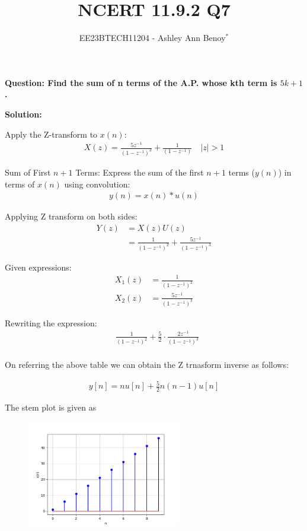 \documentclass[journal,12pt,twocolumn]{IEEEtran}
\theoremstyle{remark}
\begin{document}

\vspace{3cm}

\title{NCERT 11.9.2  Q7}
\author{EE23BTECH11204 - Ashley Ann Benoy$^{*}$}%
\maketitle
\newpage
\bigskip

\renewcommand{\thefigure}{\theenumi}
\renewcommand{\thetable}{\theenumi}



\textbf{Question: Find the sum of n terms of the A.P. whose kth term is \(5k + 1\).}

\textbf{Solution:}


Apply the Z-transform to \( x(n) \):
\begin{align}
X(z) = \frac{5z^{-1}}{(1 - z^{-1})^2} + \frac{1}{(1 - z^{-1})}
\quad |z|>1
\end{align}

Sum of First \( n+1 \) Terms:
Express the sum of the first \( n+1 \) terms (\( y(n) \)) in terms of \( x(n) \) using convolution:
\begin{align}
y(n) = x(n) * u(n)
\end{align}

Applying Z transform on both sides:
\begin{align}
    Y(z) &= X(z)U(z)\\
    &=\frac{1}{(1-z^{-1})^2} + \frac{5z^{-1}}{(1-z^{-1})^3}
\end{align}

Given expressions:
\begin{align}
    X_1(z) &= \frac{1}{{(1 - z^{-1})^2}} \\
    X_2(z) &= \frac{5z^{-1}}{{(1 - z^{-1})^3}} \label{eq:x2z}
\end{align}




Rewriting the expression:
\begin{align}
&\frac{1}{(1 - z^{-1})^2} + \frac{5}{2} \cdot \frac{2z^{-1}}{(1 - z^{-1})^3} 
\end{align}
\\
On referring the above table we can obtain the  Z trnasform inverse as follows:

\begin{align}
y[n] = n u[n] + \frac{5}{2} n(n-1) u[n]
\end{align}

The stem plot is given as
\begin{figure}[h]
  \centering
  \includegraphics[width=0.6\textwidth]{figs/stem.png}
  \label{fig:Stem_Plot}
\end{figure}
\end{document}
